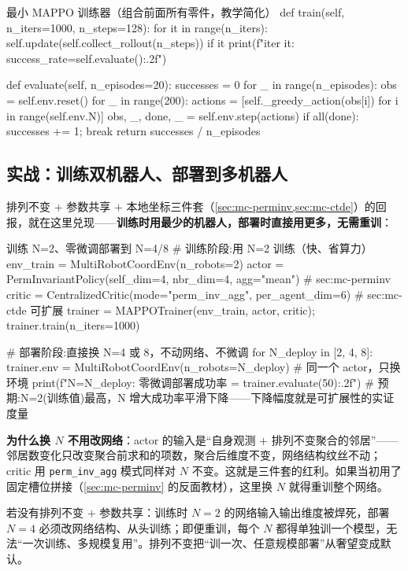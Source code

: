 \begin{codebox}[Python]{最小 MAPPO 训练器（组合前面所有零件，教学简化）}
    def train(self, n_iters=1000, n_steps=128):
        for it in range(n_iters):
            self.update(self.collect_rollout(n_steps))
            if it %
                print(f"iter {it}: success_rate={self.evaluate():.2f}")

    def evaluate(self, n_episodes=20):
        successes = 0
        for _ in range(n_episodes):
            obs = self.env.reset()
            for _ in range(200):
                actions = [self._greedy_action(obs[i]) for i in range(self.env.N)]
                obs, _, done, _ = self.env.step(actions)
                if all(done): successes += 1; break
        return successes / n_episodes
\end{codebox}

\subsection{实战：训练双机器人、部署到多机器人}
\label{sec:mc-train-deploy}

排列不变 $+$ 参数共享 $+$ 本地坐标三件套（\cref{sec:mc-perminv,sec:mc-ctde}）的回报，就在这里兑现——\textbf{训练时用最少的机器人，部署时直接用更多，无需重训}：

\begin{codebox}[Python]{训练 N=2、零微调部署到 N=4/8}
# 训练阶段:用 N=2 训练（快、省算力）
env_train = MultiRobotCoordEnv(n_robots=2)
actor  = PermInvariantPolicy(self_dim=4, nbr_dim=4, agg="mean")    # sec:mc-perminv
critic = CentralizedCritic(mode="perm_inv_agg", per_agent_dim=6)   # sec:mc-ctde 可扩展
trainer = MAPPOTrainer(env_train, actor, critic); trainer.train(n_iters=1000)

# 部署阶段:直接换 N=4 或 8，不动网络、不微调
for N_deploy in [2, 4, 8]:
    trainer.env = MultiRobotCoordEnv(n_robots=N_deploy)            # 同一个 actor，只换环境
    print(f"N={N_deploy}: 零微调部署成功率 = {trainer.evaluate(50):.2f}")
    # 预期:N=2(训练值)最高，N 增大成功率平滑下降——下降幅度就是可扩展性的实证度量
\end{codebox}

\textbf{为什么换 $N$ 不用改网络}：actor 的输入是“自身观测 $+$ 排列不变聚合的邻居”——邻居数变化只改变聚合前求和的项数，聚合后维度不变，网络结构纹丝不动；critic 用 \verb|perm_inv_agg| 模式同样对 $N$ 不变。这就是三件套的红利。如果当初用了固定槽位拼接（\cref{sec:mc-perminv} 的反面教材），这里换 $N$ 就得重训整个网络。

\begin{insight}
若没有排列不变 $+$ 参数共享：训练时 $N{=}2$ 的网络输入输出维度被焊死，部署 $N{=}4$ 必须改网络结构、从头训练；即便重训，每个 $N$ 都得单独训一个模型，无法“一次训练、多规模复用”。排列不变把“训一次、任意规模部署”从奢望变成默认。
\end{insight}

